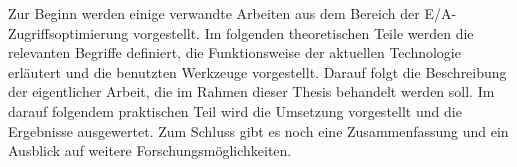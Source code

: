 Zur Beginn werden einige verwandte Arbeiten aus dem Bereich der E/A-Zugriffsoptimierung vorgestellt. Im folgenden theoretischen Teile werden die relevanten Begriffe definiert, die Funktionsweise der aktuellen Technologie erläutert und die benutzten Werkzeuge vorgestellt. Darauf folgt die Beschreibung der eigentlicher Arbeit, die im Rahmen dieser Thesis behandelt werden soll. Im darauf folgendem praktischen Teil wird die Umsetzung vorgestellt und die Ergebnisse ausgewertet. Zum Schluss gibt es noch eine Zusammenfassung und ein Ausblick auf weitere Forschungsmöglichkeiten.
